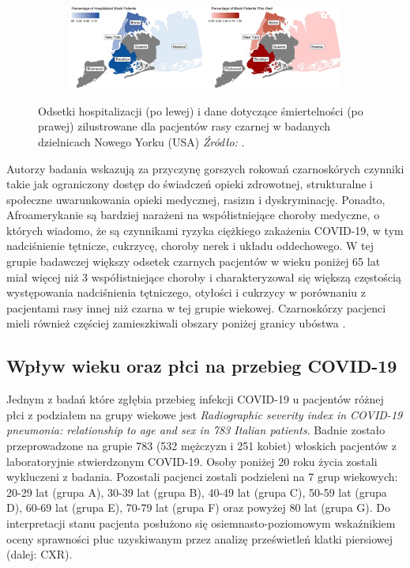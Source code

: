 \documentclass[polish, twoside, 12pt, a4paper]{article}
\theoremstyle{definition}
\theoremstyle{plain}
\theoremstyle{remark}
\begin{document}
\begin{figure}[hbt]
  \centering

  \begin{subfigure}[t]{\textwidth}
    \includegraphics[width=15cm]{NY-racial-disparities.jpg}
  \end{subfigure}

  \captionsetup{margin=10pt,font=small,labelfont=bf,width=.8\textwidth}

  \caption{Odsetki hospitalizacji (po lewej) i dane dotyczące śmiertelności (po prawej) zilustrowane dla pacjentów rasy czarnej w badanych dzielnicach Nowego Yorku (USA) \textit{Źródło:} \cite{borghesi2020}.}\label{fig:xxx1}
\end{figure}

Autorzy badania wskazują za przyczynę gorszych rokowań czarnoskórych czynniki takie jak ograniczony dostęp do świadczeń opieki zdrowotnej, strukturalne i społeczne uwarunkowania opieki medycznej, rasizm i dyskryminację. Ponadto, Afroamerykanie są bardziej narażeni na współistniejące choroby medyczne, o których wiadomo, że są czynnikami ryzyka ciężkiego zakażenia COVID-19, w tym nadciśnienie tętnicze, cukrzycę, choroby nerek i układu oddechowego. W tej grupie badawczej większy odsetek czarnych pacjentów w wieku poniżej 65 lat miał więcej niż 3 współistniejące choroby i charakteryzował się większą częstością występowania nadciśnienia tętniczego, otyłości i cukrzycy w porównaniu z pacjentami rasy innej niż czarna w tej grupie wiekowej. Czarnoskórzy pacjenci mieli również częściej zamieszkiwali obszary poniżej granicy ubóstwa \cite{borghesi2020}.

\subsection{Wpływ wieku oraz płci na przebieg COVID-19}

Jednym z badań które zgłębia przebieg infekcji COVID-19 u pacjentów różnej płci z podziałem na grupy wiekowe jest \emph{Radiographic severity index in COVID-19 pneumonia: relationship to age and sex in 783 Italian patients}. Badnie zostało przeprowadzone na grupie 783 (532 mężczyzn i 251 kobiet) włoskich pacjentów z laboratoryjnie stwierdzonym COVID-19. Osoby poniżej 20 roku życia zostali wykluczeni z badania. Pozostali pacjenci zostali podzieleni na 7 grup wiekowych: 20-29 lat (grupa A), 30-39 lat (grupa B), 40-49 lat (grupa C), 50-59 lat (grupa D), 60-69 lat (grupa E), 70-79 lat (grupa F) oraz powyżej 80 lat (grupa G). Do interpretacji stanu pacjenta posłużono się osiemnasto-poziomowym wskaźnikiem oceny sprawności płuc uzyskiwanym przez analizę prześwietleń klatki piersiowej (dalej: CXR).
\end{document}
